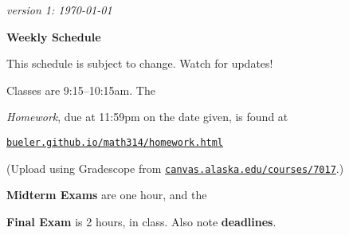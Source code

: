 \documentclass[12pt]{article}
\newcommand{\due}[1]{\strut {\color{BrickRed} \textsl{#1}}}
\newcommand{\ee}[1]{\strut {\color{Blue} \textbf{#1}}}
\newcommand{\dlinline}[1]{{\color{Purple} \textbf{#1}}}
\newcommand{\dl}[1]{{\small \dlinline{#1}}}
\begin{document}
\hfill \small \emph{version 1: \today} \normalsize

\bigskip\bigskip
\centerline{\Large \textbf{Weekly Schedule}}

\bigskip
This schedule is subject to change.  Watch for updates!

Classes are 9:15--10:15am.  The \due{Homework}, due at 11:59pm on the date given, is found at

 \quad \href{https://bueler.github.io/math314/homework.html}{\texttt{bueler.github.io/math314/homework.html}}
 
(Upload using Gradescope from \href{https://canvas.alaska.edu/courses/7017}{\texttt{canvas.alaska.edu/courses/7017}}.)  \ee{Midterm Exams} are one hour, and the \ee{Final Exam} is 2 hours, in class.  Also note \dl{deadlines}.

\bigskip
\end{document}
